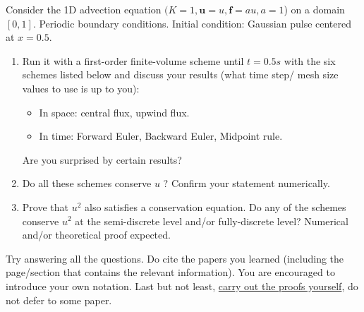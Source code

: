 \documentclass{article}
\begin{document}
\hspace*{ 0.4 cm} Consider the 1D advection equation $(K=1, \mathbf{u}=u, \mathbf{f} = a u, a=1$) on a domain $[0, 1]$. Periodic boundary conditions. Initial condition: Gaussian pulse centered at $x = 0.5$. 
\begin{enumerate}
    \item Run it with a first-order finite-volume scheme until $t=0.5 s$ with the six schemes listed below and discuss your results (what time step/ mesh size values to use is up to you):
    \begin{itemize}
        \item In space: central flux, upwind flux.
        \item In time: Forward Euler, Backward Euler, Midpoint rule.
    \end{itemize}
    Are you surprised by certain results?
    \item Do all these schemes conserve $u$ ? Confirm your statement numerically. 
    \item Prove that $u^{2}$ also satisfies a conservation equation. Do any of the schemes conserve $u^2$ at the semi-discrete level and/or fully-discrete level? Numerical and/or theoretical proof expected.
\end{enumerate}
\indent Try answering all the questions. Do cite the papers you learned \cite{LastNameJournalYear} (including the page/section that contains the relevant information). You are encouraged to introduce your own notation. Last but not least, \underline{carry out the proofs yourself}, do not defer to some paper.  



\begin{thebibliography}{9}

\end{thebibliography}
\end{document}
